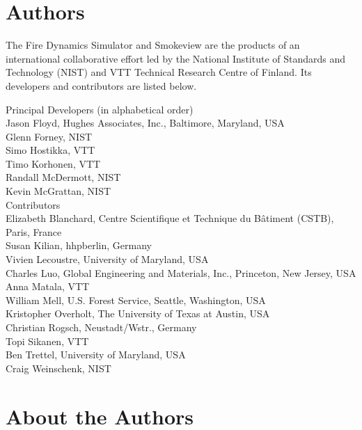 \chapter{Authors}

The Fire Dynamics Simulator and Smokeview are the products of an international collaborative effort led by
the National Institute of Standards and Technology (NIST) and VTT Technical Research Centre of Finland. Its developers and
contributors are listed below.

\vspace{0.5in}

\begin{flushleft}

Principal Developers (in alphabetical order) \\ [0.2in]

Jason Floyd, Hughes Associates, Inc., Baltimore, Maryland, USA \\
Glenn Forney, NIST \\
Simo Hostikka, VTT \\
Timo Korhonen, VTT  \\
Randall McDermott, NIST \\
Kevin McGrattan, NIST \\ [0.5in]

Contributors \\ [0.2in]

Elizabeth Blanchard, Centre Scientifique et Technique du B\^{a}timent (CSTB), Paris, France \\
Susan Kilian, hhpberlin, Germany \\
Vivien Lecoustre, University of Maryland, USA \\
Charles Luo, Global Engineering and Materials, Inc., Princeton, New Jersey, USA \\
Anna Matala, VTT \\
William Mell, U.S. Forest Service, Seattle, Washington, USA \\
Kristopher Overholt, The University of Texas at Austin, USA \\
Christian Rogsch, Neustadt/Wstr., Germany \\
Topi Sikanen, VTT \\
Ben Trettel, University of Maryland, USA \\
Craig Weinschenk, NIST

\end{flushleft}


\chapter{About the Authors}

